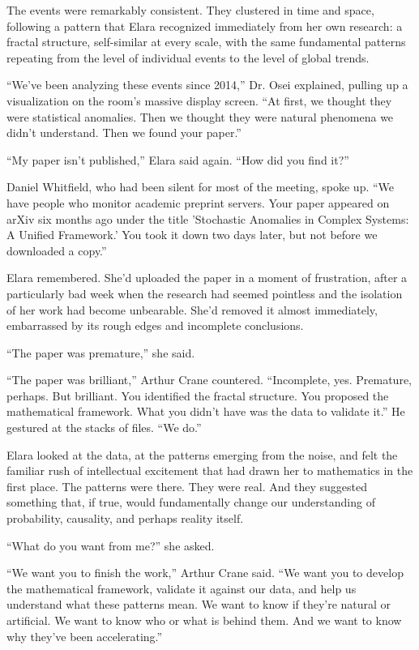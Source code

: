 \documentclass[
    language=english,
    doctype=novel,
    institution=none,
]{../../omnilatex}
\begin{document}
The events were remarkably consistent. They clustered in time and space, following a pattern that Elara recognized immediately from her own research: a fractal structure, self-similar at every scale, with the same fundamental patterns repeating from the level of individual events to the level of global trends.

``We've been analyzing these events since 2014,'' Dr. Osei explained, pulling up a visualization on the room's massive display screen. ``At first, we thought they were statistical anomalies. Then we thought they were natural phenomena we didn't understand. Then we found your paper.''

``My paper isn't published,'' Elara said again. ``How did you find it?''

Daniel Whitfield, who had been silent for most of the meeting, spoke up. ``We have people who monitor academic preprint servers. Your paper appeared on arXiv six months ago under the title 'Stochastic Anomalies in Complex Systems: A Unified Framework.' You took it down two days later, but not before we downloaded a copy.''

Elara remembered. She'd uploaded the paper in a moment of frustration, after a particularly bad week when the research had seemed pointless and the isolation of her work had become unbearable. She'd removed it almost immediately, embarrassed by its rough edges and incomplete conclusions.

``The paper was premature,'' she said.

``The paper was brilliant,'' Arthur Crane countered. ``Incomplete, yes. Premature, perhaps. But brilliant. You identified the fractal structure. You proposed the mathematical framework. What you didn't have was the data to validate it.'' He gestured at the stacks of files. ``We do.''

Elara looked at the data, at the patterns emerging from the noise, and felt the familiar rush of intellectual excitement that had drawn her to mathematics in the first place. The patterns were there. They were real. And they suggested something that, if true, would fundamentally change our understanding of probability, causality, and perhaps reality itself.

``What do you want from me?'' she asked.

``We want you to finish the work,'' Arthur Crane said. ``We want you to develop the mathematical framework, validate it against our data, and help us understand what these patterns mean. We want to know if they're natural or artificial. We want to know who or what is behind them. And we want to know why they've been accelerating.''
\end{document}
